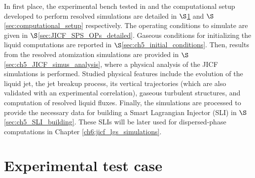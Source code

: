 In first place, the experimental bench tested in  and the computational setup developed to perform resolved simulations are detailed in $\S$\ref{sec:ch5_experimental_bench} and $\S$\ref{sec:computational_setup} respectively. The operating conditions to simulate are given in $\S$\ref{sec:JICF_SPS_OPs_detailed}. Gaseous conditions for initializing the liquid computations are reported in $\S$\ref{sec:ch5_initial_conditions}. Then, results from the resolved atomization simulations are provided in $\S$\ref{sec:ch5_JICF_simus_analysis}, where a physical analysis of the JICF simulations is performed. Studied physical features include the evolution of the liquid jet, the jet breakup process, its vertical trajectories (which are also validated with an experimental correlation), gaseous turbulent structures, and computation of resolved liquid fluxes. Finally, the simulations are processed to provide the necessary data for building a Smart Lagrangian Injector
(SLI) in $\S$\ref{sec:ch5_SLI_building}. These SLIs will be later used for dispersed-phase computations in Chapter \ref{ch6:jicf_lgs_simulations}.








\section{Experimental test case}
	\label{sec:ch5_experimental_bench}

